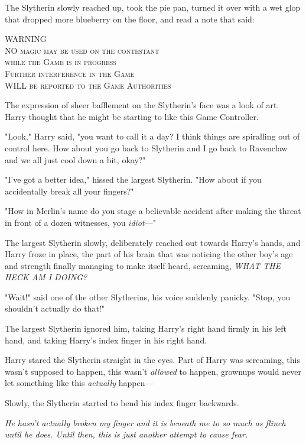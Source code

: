 The Slytherin slowly reached up, took the pie pan, turned it over with a wet
glop that dropped more blueberry on the floor, and read a note that said:
\begin{center}
\scshape \MakeUppercase{Warning}\\
\MakeUppercase{No} magic may be used on the contestant\\
while the Game is in progress\\
Further interference in the Game\\
\MakeUppercase{will} be reported to the Game Authorities
\end{center}

The expression of sheer bafflement on the Slytherin's face was a look of art.
Harry thought that he might be starting to like this Game Controller.

"Look," Harry said, "you want to call it a day? I think things are spiralling
out of control here. How about you go back to Slytherin and I go back to
Ravenclaw and we all just cool down a bit, okay?"

"I've got a better idea," hissed the largest Slytherin. "How about if you
accidentally break all your fingers?"

"How in Merlin's name do you stage a believable accident after making the
threat in front of a dozen witnesses, you \emph{idiot}---"

The largest Slytherin slowly, deliberately reached out towards Harry's hands,
and Harry froze in place, the part of his brain that was noticing the other
boy's age and strength finally managing to make itself heard, screaming,
\emph{WHAT THE HECK AM I DOING?}

"Wait!" said one of the other Slytherins, his voice suddenly panicky. "Stop,
you shouldn't actually do that!"

The largest Slytherin ignored him, taking Harry's right hand firmly in his left
hand, and taking Harry's index finger in his right hand.

Harry stared the Slytherin straight in the eyes. Part of Harry was screaming,
this wasn't supposed to happen, this wasn't \emph{allowed} to happen, grownups
would never let something like this \emph{actually} happen---

Slowly, the Slytherin started to bend his index finger backwards.

\emph{He hasn't actually broken my finger and it is beneath me to so much as
flinch until he does. Until then, this is just another attempt to cause fear.}

